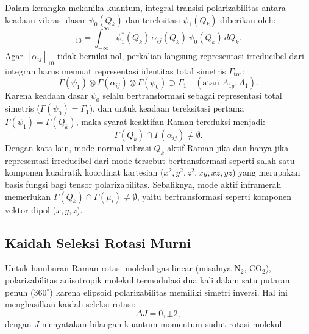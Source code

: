Dalam kerangka mekanika kuantum, integral transisi polarizabilitas antara keadaan vibrasi dasar $\psi_0(Q_k)$ dan tereksitasi $\psi_1(Q_k)$ diberikan oleh:
\begin{equation}
[\alpha_{ij}]_{10} = \int_{-\infty}^{\infty} \psi_1^*(Q_k) \, \alpha_{ij}(Q_k) \, \psi_0(Q_k) \, dQ_k.
\label{eq:integral_transisi}
\end{equation}
Agar $[\alpha_{ij}]_{10}$ tidak bernilai nol, perkalian langsung representasi irreducibel dari integran harus memuat representasi identitas total simetris $\Gamma_{\mathrm{tot}}$:
\begin{equation}
\Gamma(\psi_1) \otimes \Gamma(\alpha_{ij}) \otimes \Gamma(\psi_0) \supset \Gamma_1 \quad (\text{atau } A_{1g}, A_1).
\label{eq:teori_grup_integral}
\end{equation}
Karena keadaan dasar $\psi_0$ selalu bertransformasi sebagai representasi total simetris ($\Gamma(\psi_0) = \Gamma_1$), dan untuk keadaan tereksitasi pertama $\Gamma(\psi_1) = \Gamma(Q_k)$, maka syarat keaktifan Raman tereduksi menjadi:
\begin{equation}
\Gamma(Q_k) \cap \Gamma(\alpha_{ij}) \neq \emptyset.
\label{eq:syarat_simetri_raman}
\end{equation}
Dengan kata lain, mode normal vibrasi $Q_k$ aktif Raman jika dan hanya jika representasi irreducibel dari mode tersebut bertransformasi seperti salah satu komponen kuadratik koordinat kartesian ($x^2, y^2, z^2, xy, xz, yz$) yang merupakan basis fungsi bagi tensor polarizabilitas. Sebaliknya, mode aktif inframerah memerlukan $\Gamma(Q_k) \cap \Gamma(\mu_i) \neq \emptyset$, yaitu bertransformasi seperti komponen vektor dipol ($x, y, z$).

\subsection{Kaidah Seleksi Rotasi Murni}
Untuk hamburan Raman rotasi molekul gas linear (misalnya $\text{N}_2$, $\text{CO}_2$), polarizabilitas anisotropik molekul termodulasi dua kali dalam satu putaran penuh ($360^\circ$) karena elipsoid polarizabilitas memiliki simetri inversi. Hal ini menghasilkan kaidah seleksi rotasi:
\begin{equation}
\Delta J = 0, \pm 2,
\label{eq:kaidah_rotasi}
\end{equation}
dengan $J$ menyatakan bilangan kuantum momentum sudut rotasi molekul.

